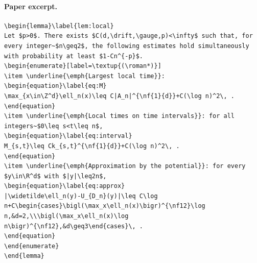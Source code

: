 \paragraph{Paper excerpt.}
\begin{verbatim}
\begin{lemma}\label{lem:local}
Let $p>0$. There exists $C(d,\drift,\gauge,p)<\infty$ such that, for every integer~$n\geq2$, the following estimates hold simultaneously with probability at least $1-Cn^{-p}$.
\begin{enumerate}[label=\textup{(\roman*)}]
\item \underline{\emph{Largest local time}}:
\begin{equation}\label{eq:M}
\max_{x\in\Z^d}\ell_n(x)\leq C|A_n|^{\nf{1}{d}}+C(\log n)^2\, .
\end{equation}
\item \underline{\emph{Local times on time intervals}}: for all integers~$0\leq s<t\leq n$,
\begin{equation}\label{eq:interval}
M_{s,t}\leq Ck_{s,t}^{\nf{1}{d}}+C(\log n)^2\, .
\end{equation}
\item \underline{\emph{Approximation by the potential}}: for every $y\in\R^d$ with $|y|\leq2n$,
\begin{equation}\label{eq:approx}
|\widetilde\ell_n(y)-U_{D_n}(y)|\leq C\log n+C\begin{cases}\bigl(\max_x\ell_n(x)\bigr)^{\nf12}\log n,&d=2,\\\bigl(\max_x\ell_n(x)\log n\bigr)^{\nf12},&d\geq3\end{cases}\, .
\end{equation}
\end{enumerate}
\end{lemma}
\end{verbatim}
